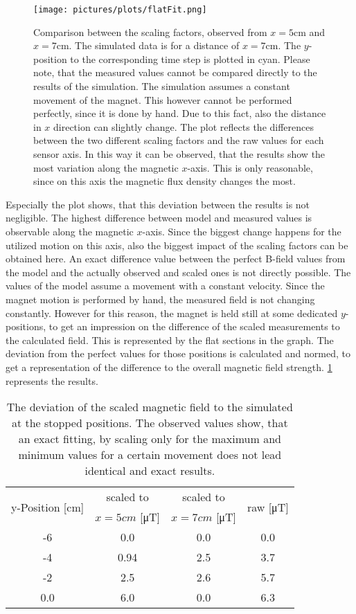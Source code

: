 \begin{figure}[h]
\texttt{[image: pictures/plots/flatFit.png]}
\caption{Comparison between the scaling factors, observed from $ x=5\si{\cm} $ and $ x=7\si{\cm} $. The simulated data is for a distance of $ x=7\si{\cm} $. The $ y $-position to the corresponding time step is plotted in cyan. Please note, that the measured values cannot be compared directly to the results of the simulation. The simulation assumes a constant movement of the magnet. This however cannot be performed perfectly, since it is done by hand. Due to this fact, also the distance in $ x $ direction can slightly change. The plot reflects the differences between the two different scaling factors and the raw values for each sensor axis. In this way it can be observed, that the results show the most variation along the magnetic $ x $-axis. This is only reasonable, since on this axis the magnetic flux density changes the most.}
\label{fig:flatFit}
\end{figure}
Especially the plot shows, that this deviation between the results is not negligible. The highest difference between model and measured values is observable along the magnetic $ x $-axis. Since the biggest change happens for the utilized motion on this axis, also the biggest impact of the scaling factors can be obtained here. An exact difference value between the perfect B-field values from the model and the actually observed and scaled ones is not directly possible. The values of the model assume a movement with a constant velocity. Since the magnet motion is performed by hand, the measured field is not changing constantly. However for this reason, the magnet is held still at some dedicated $ y $-positions, to get an impression on the difference of the scaled measurements to the calculated field. This is represented by the flat sections in the graph. The deviation from the perfect values for those positions is calculated and normed, to get a representation of the difference to the overall magnetic field strength. \ref{tab:diffScaled} represents the results.
\begin{table}[h!]
\centering
\begin{tabular}{c c c c}
\toprule
\multirow{2}{*}{y-Position [\si{cm}]} & scaled to  & scaled to  & \multirow{2}{*}{raw [\si{\micro \tesla}]} \\ 
 & $ x=5\si{cm} $ [\si{\micro \tesla}] & $ x=7\si{cm} $ [\si{\micro \tesla}]  & \\ \midrule
-6    & 0.0  &  0.0  & 0.0 	\\ 
-4    &	0.94 &  2.5  & 3.7 	\\ 
-2    &	2.5  &  2.6  & 5.7 	\\ 
0.0	  &	6.0  &  0.0  & 6.3 	\\ \bottomrule
\end{tabular}
\caption{The deviation of the scaled magnetic field to the simulated at the stopped positions. The observed values show, that an exact fitting, by scaling only for the maximum and minimum values for a certain movement does not lead identical and exact results.}
\label{tab:diffScaled}
\end{table}
